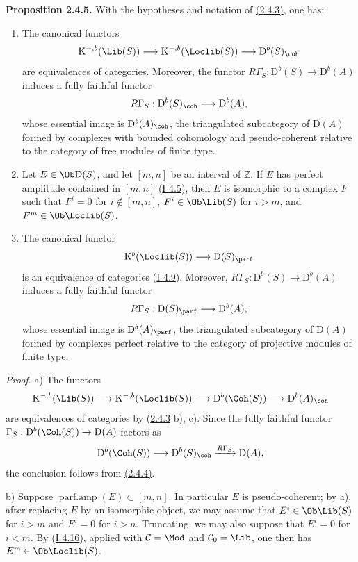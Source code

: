 \textbf{Proposition 2.4.5.} With the hypotheses and notation of \hyperlink{sga6.e02.lem.2-4-3}{(2.4.3)}, one has:
\begin{enumerate}[label=\alph*)]
\item The canonical functors
\[
\mathrm K^{-,b}(\Lib(S))\longrightarrow\mathrm K^{-,b}(\Loclib(S))\longrightarrow \mathrm D^b(S)_{\coh}
\]
are equivalences of categories. Moreover, the functor $R\Gamma_S:\mathrm D^b(S)\to\mathrm D^b(A)$ induces a fully faithful functor
\[
R\Gamma_S:\mathrm D^b(S)_{\coh}\longrightarrow \mathrm D^b(A),
\]
whose essential image is $\mathrm D^b(A)_{\coh}$, the triangulated subcategory of $\mathrm D(A)$ formed by complexes with bounded cohomology and pseudo-coherent relative to the category of free modules of finite type.
\item Let $E\in\Ob\mathrm D(S)$, and let $[m,n]$ be an interval of $\mathbb Z$. If $E$ has perfect amplitude contained in $[m,n]$ (\hyperlink{sga6.e01.notation.4-5}{I 4.5}), then $E$ is isomorphic to a complex $F$ such that $F^i=0$ for $i\notin[m,n]$, $F^i\in\Ob\Lib(S)$ for $i>m$, and $F^m\in\Ob\Loclib(S)$.
\item The canonical functor
\[
\mathrm K^b(\Loclib(S))\longrightarrow \mathrm D(S)_{\parf}
\]
is an equivalence of categories (\hyperlink{sga6.e01.notation.4-9}{I 4.9}). Moreover, $R\Gamma_S:\mathrm D^b(S)\to\mathrm D^b(A)$ induces a fully faithful functor
\[
R\Gamma_S:\mathrm D(S)_{\parf}\longrightarrow\mathrm D^b(A),
\]
whose essential image is $\mathrm D^b(A)_{\parf}$, the triangulated subcategory of $\mathrm D(A)$ formed by complexes perfect relative to the category of projective modules of finite type.
\end{enumerate}

\emph{Proof.} a) The functors
\[
\mathrm K^{-,b}(\Lib(S))\longrightarrow\mathrm K^{-,b}(\Loclib(S))\longrightarrow
\mathrm D^b(\Coh(S))\longrightarrow\mathrm D^b(A)_{\coh}
\]
are equivalences of categories by (\hyperlink{sga6.e02.lem.2-4-3}{2.4.3} b), c). Since the fully faithful functor $\Gamma_S:\mathrm D^b(\Coh(S))\to\mathrm D(A)$ factors as
\[
\mathrm D^b(\Coh(S))\longrightarrow\mathrm D^b(S)_{\coh}\xrightarrow{R\Gamma_S}\mathrm D(A),
\]
the conclusion follows from \hyperlink{sga6.e02.lem.2-4-4}{(2.4.4)}.

b) Suppose $\operatorname{parf.amp}(E)\subset[m,n]$. In particular $E$ is pseudo-coherent; by a), after replacing $E$ by an isomorphic object, we may assume that $E^i\in\Ob\Lib(S)$ for $i>m$ and $E^i=0$ for $i>n$. Truncating, we may also suppose that $E^i=0$ for $i<m$. By (\hyperlink{sga6.e01.lem.4-16}{I 4.16}), applied with $\mathcal C=\Mod$ and $\mathcal C_0=\Lib$, one then has $E^m\in\Ob\Loclib(S)$.

